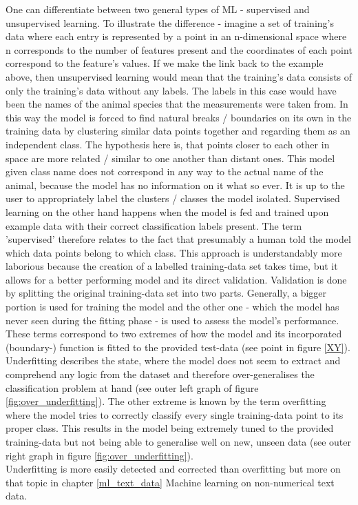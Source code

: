 One can differentiate between two general types of ML - supervised and unsupervised learning. To illustrate the difference - imagine a set of training's data where each entry is represented by a point in an n-dimensional space where n corresponds to the number of features present and the coordinates of each point correspond to the feature's values. If we make the link back to the example above, then unsupervised learning would mean that the training's data consists of only the training's data without any labels. The labels in this case would have been the names of the animal species that the measurements were taken from. In this way the model is forced to find natural breaks / boundaries on its own in the training data by clustering similar data points together and regarding them as an independent class. The hypothesis here is, that points closer to each other in space are more related / similar to one another than distant ones. This model given class name does not correspond in any way to the actual name of the animal, because the model has no information on it what so ever. It is up to the user to appropriately label the clusters / classes the model isolated.
Supervised learning on the other hand happens when the model is fed and trained upon example data with their correct classification labels present. The term 'supervised' therefore relates to the fact that presumably a human told the model which data points belong to which class. This approach is understandably more laborious because the creation of a labelled training-data set takes time, but it allows for a better performing model and its direct validation. Validation is done by splitting the original training-data set into two parts. Generally, a bigger portion is used for training the model and the other one - which the model has never seen during the fitting phase - is used to assess the model's performance.\\
\newline
These terms correspond to two extremes of how the model and its incorporated (boundary-) function is fitted to the provided test-data (see point in figure \ref{XY}). Underfitting describes the state, where the model does not seem to extract and comprehend any logic from the dataset and therefore over-generalises the classification problem at hand (see outer left graph of figure \ref{fig:over_underfitting}). The other extreme is known by the term overfitting where the model tries to correctly classify every single training-data point to its proper class. This results in the model being extremely tuned to the provided training-data but not being able to generalise well on new, unseen data (see outer right graph in figure \ref{fig:over_underfitting}).\\
Underfitting is more easily detected and corrected than overfitting but more on that topic in chapter \ref{ml_text_data} Machine learning on non-numerical text data.

